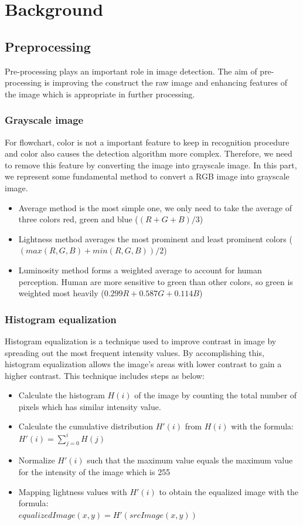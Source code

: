 \chapter{Background} \label{background}

\section{Preprocessing}
Pre-processing plays an important role in image detection. The aim of pre-processing is improving the construct the raw image and enhancing features of the image which is appropriate in further processing.

\subsection{Grayscale image}
For flowchart, color is not a important feature to keep in recognition procedure and color also causes the detection algorithm more complex. Therefore, we need to remove this feature by converting the image into grayscale image. In this part, we represent some fundamental method to convert a RGB image into grayscale image.
\begin{itemize}
    \item Average method is the most simple one, we only need to take the average of three colors red, green and blue ($(R+G+B)/3$)
    \item Lightness method averages the most prominent and least prominent colors ($(max(R, G, B) + min(R, G, B)) / 2$)
    \item Luminosity method forms a weighted average to account for human perception. Human are more sensitive to green than other colors, so green is weighted most heavily ($0.299 R + 0.587 G + 0.114 B$)
\end{itemize}

\subsection{Histogram equalization}
Histogram equalization is a technique used to improve contrast in image by spreading out the most frequent intensity values. By accomplishing this, histogram equalization allows the image’s areas with lower contrast to gain a higher contrast. This technique includes steps as below:
\begin{itemize}
    \item Calculate the histogram $H(i)$ of the image by counting the total number of pixels which has similar intensity value.
    \item Calculate the cumulative distribution $H'(i)$ from $H(i)$ with the formula: $H'(i) = \sum \limits_{j=0}^i  H(j)$
    \item Normalize $H'(i)$ such that the maximum value equals the maximum value for the intensity of the image which is 255
    \item Mapping lightness values with $H'(i)$ to obtain the equalized image with the formula: \\ $equalizedImage(x,y) = H'(srcImage(x,y))$
\end{itemize}
